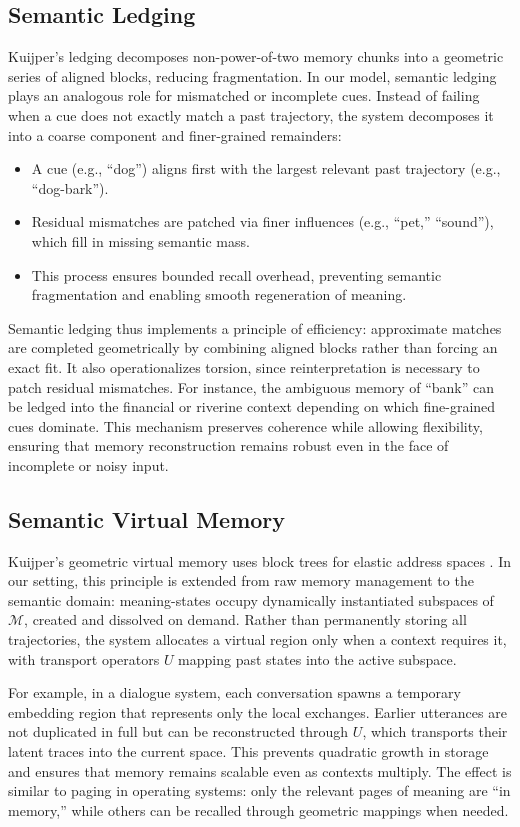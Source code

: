 \documentclass[a4paper,12pt]{article}
\newcommand{\M}{\mathcal{M}}
\begin{document}
\subsection{Semantic Ledging}
Kuijper’s ledging \citep{kuijper2021geometric} decomposes non-power-of-two memory chunks into a geometric series of aligned blocks, reducing fragmentation. In our model, semantic ledging plays an analogous role for mismatched or incomplete cues. Instead of failing when a cue does not exactly match a past trajectory, the system decomposes it into a coarse component and finer-grained remainders:
\begin{itemize}
    \item A cue (e.g., ``dog'') aligns first with the largest relevant past trajectory (e.g., ``dog-bark'').
    \item Residual mismatches are patched via finer influences (e.g., ``pet,'' ``sound''), which fill in missing semantic mass.
    \item This process ensures bounded recall overhead, preventing semantic fragmentation and enabling smooth regeneration of meaning.
\end{itemize}
Semantic ledging thus implements a principle of efficiency: approximate matches are completed geometrically by combining aligned blocks rather than forcing an exact fit. It also operationalizes torsion, since reinterpretation is necessary to patch residual mismatches. For instance, the ambiguous memory of ``bank'' can be ledged into the financial or riverine context depending on which fine-grained cues dominate. This mechanism preserves coherence while allowing flexibility, ensuring that memory reconstruction remains robust even in the face of incomplete or noisy input.

\subsection{Semantic Virtual Memory}
Kuijper’s geometric virtual memory uses block trees for elastic address spaces \citep{kuijper2021geometric}. 
In our setting, this principle is extended from raw memory management to the semantic domain: 
meaning-states occupy dynamically instantiated subspaces of $\M$, created and dissolved on demand. 
Rather than permanently storing all trajectories, the system allocates a virtual region only when 
a context requires it, with transport operators $U$ mapping past states into the active subspace.

For example, in a dialogue system, each conversation spawns a temporary embedding region that 
represents only the local exchanges. Earlier utterances are not duplicated in full but can be 
reconstructed through $U$, which transports their latent traces into the current space. This prevents 
quadratic growth in storage and ensures that memory remains scalable even as contexts multiply. 
The effect is similar to paging in operating systems: only the relevant pages of meaning are ``in 
memory,'' while others can be recalled through geometric mappings when needed.
\end{document}

